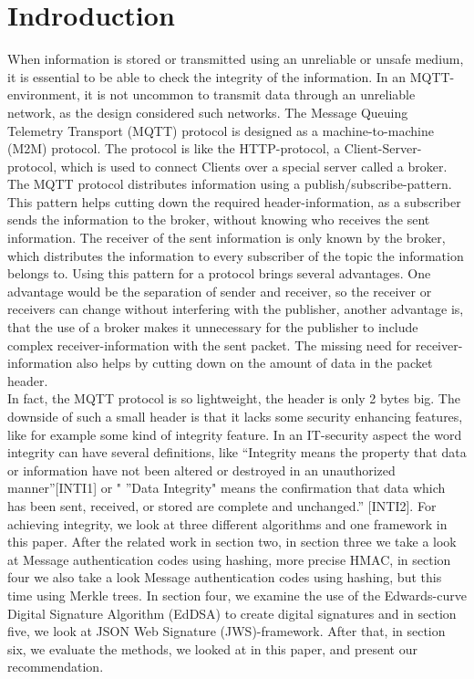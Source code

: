 \section{Indroduction}

When information is stored or transmitted using an unreliable or unsafe medium, it is essential to be able to check the integrity of the information. In an MQTT-environment, it is not uncommon to transmit data through an unreliable network, as the design considered such networks. The Message Queuing Telemetry Transport (MQTT) protocol is designed as a machine-to-machine (M2M) protocol. The protocol is like the HTTP-protocol, a Client-Server-protocol, which is used to connect Clients over a special server called a broker. The MQTT protocol distributes information using a publish/subscribe-pattern. This pattern helps cutting down the required header-information, as a subscriber sends the information to the broker, without knowing who receives the sent information. The receiver of the sent information is only known by the broker, which distributes the information to every subscriber of the topic the information belongs to. Using this pattern for a protocol brings several advantages. One advantage would be the separation of sender and receiver, so the receiver or receivers can change without interfering with the publisher, another advantage is, that the use of a broker makes it unnecessary for the publisher to include complex receiver-information with the sent packet. The missing need for receiver-information also helps by cutting down on the amount of data in the packet header. \\
In fact, the MQTT protocol is so lightweight, the header is only 2 bytes big. The downside of such a small header is that it lacks some security enhancing features, like for example some kind of integrity feature. In an IT-security aspect the word integrity can have several definitions, like “Integrity means the property that data or information have not been altered or destroyed in an unauthorized manner”[INTI1] or " ”Data Integrity" means the confirmation that data which has been sent, received, or stored are complete and unchanged.” [INTI2]. For achieving integrity, we look at three different algorithms and one framework in this paper. After the related work in section two, in section three we take a look at Message authentication codes using hashing, more precise HMAC, in section four we also take a look Message authentication codes using hashing, but this time using Merkle trees. In section four, we examine the use of the Edwards-curve Digital Signature Algorithm (EdDSA) to create digital signatures and in section five, we look at JSON Web Signature (JWS)-framework. After that, in section six, we evaluate the methods, we looked at in this paper, and present our recommendation.
